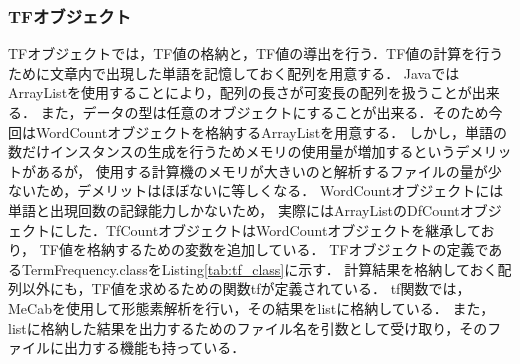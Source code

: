 \documentclass[a4paper,11pt]{ltjsarticle}
\begin{document}
\subsubsection{TFオブジェクト}
TFオブジェクトでは，TF値の格納と，TF値の導出を行う．TF値の計算を行うために文章内で出現した単語を記憶しておく配列を用意する．
JavaではArrayListを使用することにより，配列の長さが可変長の配列を扱うことが出来る．
また，データの型は任意のオブジェクトにすることが出来る．そのため今回はWordCountオブジェクトを格納するArrayListを用意する．
しかし，単語の数だけインスタンスの生成を行うためメモリの使用量が増加するというデメリットがあるが，
使用する計算機のメモリが大きいのと解析するファイルの量が少ないため，デメリットはほぼないに等しくなる．
WordCountオブジェクトには単語と出現回数の記録能力しかないため，
実際にはArrayListのDfCountオブジェクトにした．TfCountオブジェクトはWordCountオブジェクトを継承しており，
TF値を格納するための変数を追加している．
TFオブジェクトの定義であるTermFrequency.classをListing\ref{tab:tf_class}に示す．
計算結果を格納しておく配列以外にも，TF値を求めるための関数tfが定義されている．
tf関数では，MeCabを使用して形態素解析を行い，その結果をlistに格納している．
また，listに格納した結果を出力するためのファイル名を引数として受け取り，そのファイルに出力する機能も持っている．
\end{document}
